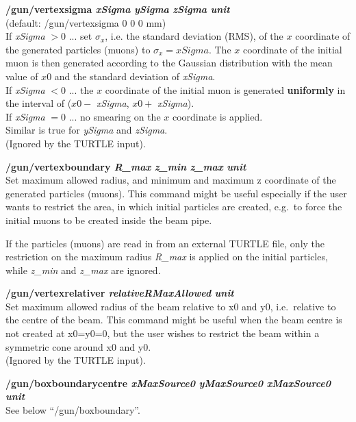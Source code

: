 \documentclass[twoside]{dis04}
\begin{document}
\begin{description}
\item{\bf /gun/vertexsigma \emph{xSigma} \emph{ySigma} \emph{zSigma} \emph{unit}}\\
	(default: /gun/vertexsigma 0 0 0 mm) \\
	If {\it xSigma} $>0$ ...  set $\sigma_x$, i.e. the standard deviation (RMS), of the $x$ coordinate
	of the generated particles (muons) to $\sigma_x=xSigma$. The $x$ coordinate of the initial
        muon is then generated according to the Gaussian distribution with the mean value of $x0$
	and the standard deviation of {\it xSigma}. \\
	If {\it xSigma} $<0$ ... the $x$ coordinate of the initial
        muon is generated {\bf uniformly} in the interval of ($x0-$ {\it xSigma}, $x0+$ {\it xSigma}).\\
	If {\it xSigma} $= 0$ ... no smearing on the $x$ coordinate is applied.\\
	Similar is true for {\it ySigma} and {\it zSigma}. \\
	(Ignored by the TURTLE input).	

\item{\bf /gun/vertexboundary \emph{R\_max} \emph{z\_min} \emph{z\_max} \emph{unit}}\\
	Set maximum allowed radius, and minimum and maximum z coordinate of the generated particles (muons).
	This command might be useful especially if the user wants to restrict the
	area, in which initial particles are created, e.g.\ to force the initial muons
        to be created inside the beam pipe.

	If the particles (muons) are read in from an external TURTLE file, 
	only the restriction on the maximum radius \emph{R\_max}
	is applied on the initial particles, while \emph{z\_min} and \emph{z\_max} are ignored.

\item{\bf /gun/vertexrelativer \emph{relativeRMaxAllowed} \emph{unit}}\\
        Set maximum allowed radius of the beam relative to x0 and y0,
	i.e.\ relative to the centre of the beam.  This command might be useful when the beam
	centre is not created at x0=y0=0, but the user wishes to restrict the beam
	within a symmetric cone around x0 and y0. \\
	(Ignored by the TURTLE input).

\item{\bf /gun/boxboundarycentre \emph{xMaxSource0} \emph{yMaxSource0} \emph{xMaxSource0}  \emph{unit}} \\
        See below ``/gun/boxboundary''.


\end{description}
\end{document}
